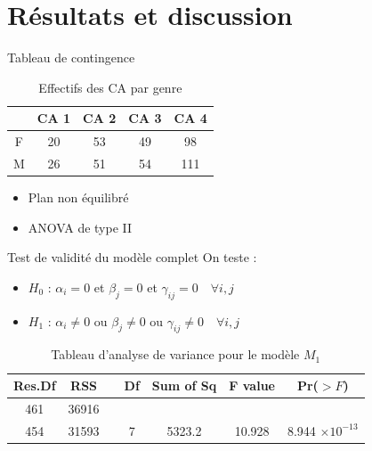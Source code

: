 \documentclass{beamer}
\begin{document}
	
	
	\section{Résultats et discussion}
	
	\begin{frame}{Tableau de contingence}
		\begin{table}[H]
			\centering
			\caption{Effectifs des CA par genre}
			\begin{tabular}{ccccc}
				\toprule
				& CA 1 & CA 2 & CA 3 & CA 4 \\ 
				\midrule
				F & 20 & 53 & 49 & 98 \\ 
				M & 26 & 51 & 54 & 111 \\ 
				\bottomrule
			\end{tabular}
			\label{tab:ca_gender}
		\end{table}
		
		\begin{itemize}
			\item Plan non équilibré
			\item ANOVA de type II
		\end{itemize}
	\end{frame}
	
	\begin{frame}{Test de validité du modèle complet}
		On teste :
		\begin{itemize}
			\item \textbf{$H_0$} : $\alpha_i = 0$ et $\beta_j = 0$ et $\gamma_{ij} = 0 \quad \forall i, j$
			\item \textbf{$H_1$} : $\alpha_i \neq 0$ ou $\beta_j \neq 0$ ou $\gamma_{ij} \neq 0 \quad \forall  i, j$
		\end{itemize}
		
		\begin{table}[H]
			\centering
			\caption{Tableau d'analyse de variance pour le modèle $M_1$}
			\begin{tabular}{ccccccc}
				\toprule
				\textbf{Res.Df} & \textbf{RSS} & & \textbf{Df} & \textbf{Sum of Sq} & \textbf{F value} & \textbf{Pr($>F$)} \\ 
				\midrule
				461 & 36916 & & & & & \\ 
				454 & 31593 & & 7 & 5323.2 & 10.928 & 8.944 $\times 10^{-13}$ \\ 
				\bottomrule
			\end{tabular}
			\label{tab:anova_results1}
		\end{table}
	\end{frame}
	
\end{document}
